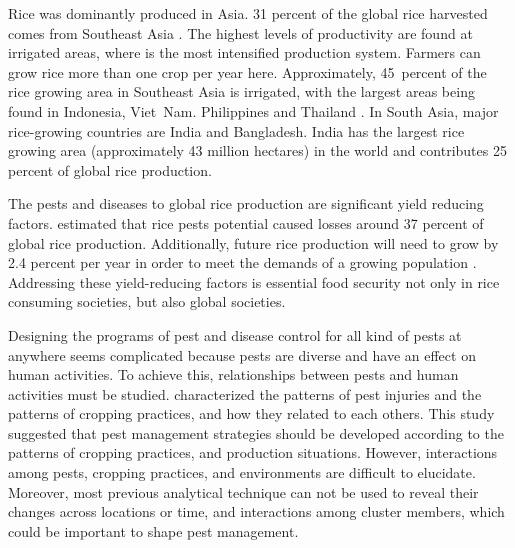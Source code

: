 
Rice was dominantly produced in Asia. 31 percent of the global rice harvested comes from Southeast Asia . The highest levels of productivity are found at irrigated areas, where is the most intensified production system. Farmers can grow rice more than one crop per year here. Approximately, 45 percent of the rice growing area in Southeast Asia is irrigated, with the largest areas being found in Indonesia, Viet Nam. Philippines and Thailand . In South Asia, major rice-growing countries are India and Bangladesh. India has the largest rice growing area (approximately 43 million hectares) in the world and contributes 25 percent of global rice production. 

The pests and diseases to global rice production are significant yield reducing factors.  estimated that rice pests potential caused losses around 37 percent of global rice production. Additionally, future rice production will need to grow by 2.4 percent per year in order to meet the demands of a growing population . Addressing these yield-reducing factors is essential food security not only in rice consuming societies, but also global societies. 


Designing the programs of pest and disease control for all kind of pests at anywhere seems complicated because pests are diverse and have an effect on human activities. To achieve this, relationships between pests and human activities must be studied.  characterized the patterns of pest injuries and the patterns of cropping practices, and how they related to each others. This study suggested that pest management strategies should be developed according to the patterns of cropping practices, and production situations. However, interactions among pests, cropping practices, and environments are difficult to elucidate. Moreover, most previous analytical technique can not be used to reveal their changes across locations or time, and interactions among cluster members, which could be important to shape pest management. 

